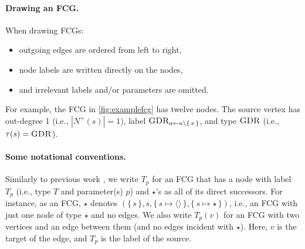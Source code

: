 
\paragraph{Drawing an FCG.}
When drawing FCGs:
\begin{itemize}
  \item outgoing edges are ordered from left to right,
  \item node labels are written directly on the nodes,
  \item and irrelevant labels and/or parameters are omitted.
\end{itemize}
For example, the FCG in \cref{fig:examplefcg} has twelve nodes. The source
vertex has out-degree 1 (i.e., $|N^+(s)| = 1$), label
$\operatorname{\textsc{GDR}}_{a \gets a \setminus \{\, x \,\}}$, and type $\operatorname{\textsc{GDR}}$ (i.e.,
$\tau(s) = \operatorname{\textsc{GDR}}$).

\paragraph{Some notational conventions.}
Similarly to previous work \citep{DBLP:conf/ijcai/BroeckTMDR11}, we write $T_p$
for an FCG that has a node with label $T_p$ (i.e., type $T$ and parameter(s)
$p$) and $\star$'s as all of its direct successors. For instance, as an FCG,
$\star$ denotes
$(\{\, s \,\}, s, \{\, s \mapsto \langle\rangle \,\}, \{\, s \mapsto \star \,\})$,
i.e., an FCG with just one node of type $\star$ and no edges. We also write
$T_p(v)$ for an FCG with two vertices and an edge between them (and no edges
incident with $\star$). Here, $v$ is the target of the edge, and $T_p$ is the
label of the source.

